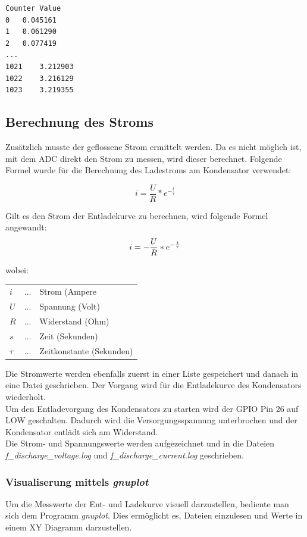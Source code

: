 \documentclass{article}
\begin{document}
\begin{lstlisting}
Counter Value
0	0.045161
1	0.061290
2	0.077419
...
1021	3.212903
1022	3.216129
1023	3.219355
\end{lstlisting}

\subsection{Berechnung des Stroms}
Zusätzlich musste der geflossene Strom ermittelt werden. Da es nicht möglich ist, mit dem ADC direkt den Strom zu messen, wird dieser berechnet.
Folgende Formel wurde für die Berechnung des Ladestroms am Kondensator verwendet:

\begin{equation}
    i=\frac{U}{R} * e^{-\frac{t}{\tau}}
\end{equation}

Gilt es den Strom der Entladekurve zu berechnen, wird folgende Formel angewandt:
\begin{equation}
    i=-\frac{U}{R} * e^{-\frac{t}{\tau}}\\
\end{equation}

wobei:
\begin{table}[h!]
    \begin{tabular}{lll}
    $i$ & ...      & Strom (Ampere            \\
    $U$ & ...      & Spannung (Volt)          \\
    $R$ & ...     & Widerstand (Ohm)         \\
    $s$ & ...     & Zeit (Sekunden)          \\
    $\tau$ & ... & Zeitkonstante (Sekunden)
    \end{tabular}
\end{table}
\newpage

Die Stromwerte werden ebenfalls zuerst in einer Liste gespeichert und danach in eine Datei geschrieben.
Der Vorgang wird für die Entladekurve des Kondensators wiederholt.\\
Um den Entladevorgang des Kondensators zu starten wird der GPIO Pin 26 auf LOW geschalten. 
Dadurch wird die Versorgungsspannung unterbrochen und der Kondensator entlädt sich am Widerstand.\\
Die Strom- und Spannungswerte werden aufgezeichnet und in die Dateien \textit{f\_discharge\_voltage.log} und \textit{f\_discharge\_current.log} geschrieben.

\subsubsection{Visualiserung mittels \textit{gnuplot}}
Um die Messwerte der Ent- und Ladekurve visuell darzustellen, bediente man sich dem Programm \textit{gnuplot}. 
Dies ermöglicht es, Dateien einzulesen und Werte in einem XY Diagramm darzustellen. \\
\end{document}
